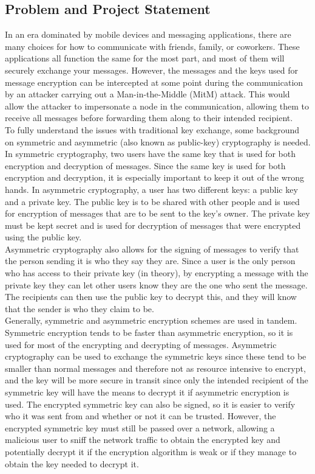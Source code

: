 \documentclass[11pt]{article}
\begin{document}
\subsection{Problem and Project Statement}
In an era dominated by mobile devices and messaging applications, there are many choices for how to communicate with friends, family, or coworkers. These applications all function the same for the most part, and most of them will securely exchange your messages. However, the messages and the keys used for message encryption can be intercepted at some point during the communication by an attacker carrying out a Man-in-the-Middle (MitM) attack. This would allow the attacker to impersonate a node in the communication, allowing them to receive all messages before forwarding them along to their intended recipient. \\

To fully understand the issues with traditional key exchange, some background on symmetric and  asymmetric (also known as public-key) cryptography is needed. In symmetric cryptography, two users have the same key that is used for both encryption and decryption of messages. Since the same key is used for both encryption and decryption, it is especially important to keep it out of the wrong hands. In asymmetric cryptography, a user has two different keys: a public key and a private key. The public key is to be shared with other people and is used for encryption of messages that are to be sent to the key’s owner. The private key must be kept secret and is used for decryption of messages that were encrypted using the public key. \\

Asymmetric cryptography also allows for the signing of messages to verify that the person sending it is who they say they are. Since a user is the only person who has access to their private key (in theory), by encrypting a message with the private key they can let other users know they are the one who sent the message. The recipients can then use the public key to decrypt this, and they will know that the sender is who they claim to be. \\

Generally, symmetric and asymmetric encryption schemes are used in tandem. Symmetric encryption tends to be faster than asymmetric encryption, so it is used for most of the  encrypting and decrypting of messages. Asymmetric cryptography can be used to exchange the symmetric keys since these tend to be smaller than normal messages and therefore not as resource intensive to encrypt, and the key will be more secure in transit since only the intended recipient of the symmetric key will have the means to decrypt it if asymmetric encryption is used. The encrypted symmetric key can also be signed, so it is easier to verify who it was sent from and whether or not it can be trusted. However, the encrypted symmetric key must still be passed over a network, allowing a malicious user to sniff the network traffic to obtain the encrypted key and potentially decrypt it if the encryption algorithm is weak or if they manage to obtain the key needed to decrypt it. \\
\end{document}
